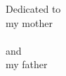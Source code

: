 \thispagestyle{empty}

\pagebreak
\hspace{0pt}
\vfill
\centering
Dedicated to \\
my mother \\
\textbf{\dedicationNamea} \\
\vspace{0.2cm}
and \\
my father \\
\textbf{\dedicationNameb}
\vfill
\hspace{0pt}
\pagebreak